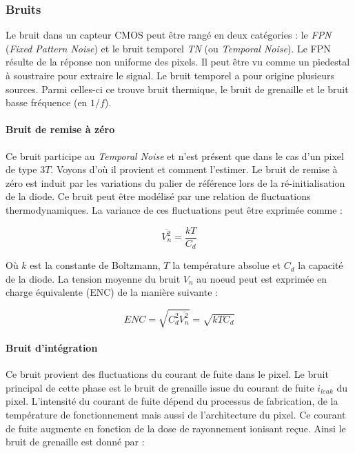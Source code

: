    \subsubsection{Bruits}

   Le bruit dans un capteur CMOS peut \^etre rang\'e en deux cat\'egories : le \textit{FPN} (\textit{Fixed Pattern Noise}) et le bruit temporel \textit{TN} (ou \textit{Temporal Noise}). Le FPN r\'esulte de la r\'eponse non uniforme des pixels. Il peut \^etre vu comme un piedestal \`a soustraire pour extraire le signal. Le bruit temporel a pour origine plusieurs sources. Parmi celles-ci ce trouve bruit thermique, le bruit de grenaille et le bruit basse fr\'equence (en $1/f$).
   
   \paragraph{Bruit de remise \`a z\'ero}
   
   Ce bruit participe au \textit{Temporal Noise} et n'est pr\'esent que dans le cas d'un pixel de type $3T$. Voyons d'o\`u il provient et comment l'estimer. Le bruit de remise \`a z\'ero est induit par les variations du palier de référence lors de la ré-initialisation de la diode. Ce bruit peut \^etre mod\'elisé par une relation de fluctuations thermodynamiques. La variance de ces fluctuations peut \^etre exprim\'ee comme : 
   
   \begin{equation}
    \overline{V_n^2} = \dfrac{kT}{C_d}
   \end{equation}

   O\`u $k$ est la constante de Boltzmann, $T$ la temp\'erature absolue et $C_d$ la capacit\'e de la diode. La tension moyenne du bruit $V_n$ au noeud peut est exprim\'ee en charge \'equivalente (ENC) de la mani\`ere suivante : 
   
   \begin{equation}
    ENC = \sqrt{C_d^2 \overline{V_n^2} } = \sqrt{k T C_d}
   \end{equation}
   
   \paragraph{Bruit d'int\'egration}
   
   Ce bruit provient des fluctuations du courant de fuite dans le pixel. Le bruit principal de cette phase est le bruit de grenaille issue du courant de fuite $i_{leak}$ du pixel. L'intensit\'e du courant de fuite d\'epend du processus de fabrication, de la temp\'erature de fonctionnement mais aussi de l'architecture du pixel. Ce courant de fuite augmente en fonction de la dose de rayonnement ionisant re\c{c}ue. Ainsi le bruit de grenaille est donn\'e par : 
   
